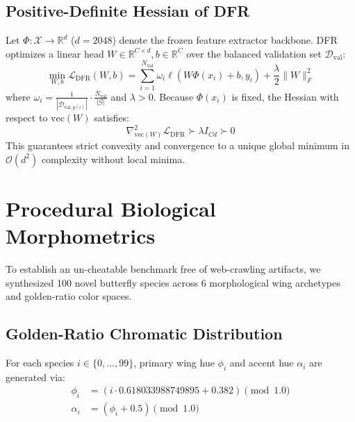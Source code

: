 \documentclass[10pt,journal,compsoc]{IEEEtran}
\begin{document}
\subsection{Positive-Definite Hessian of DFR}
Let $\Phi: \mathcal{X} \to \mathbb{R}^d$ ($d = 2048$) denote the frozen feature extractor backbone. DFR optimizes a linear head $W \in \mathbb{R}^{C \times d}, b \in \mathbb{R}^C$ over the balanced validation set $\mathcal{D}_{\text{val}}$:
\begin{equation}
\min_{W, b} \mathcal{L}_{\text{DFR}}(W, b) = \sum_{i=1}^{N_{\text{val}}} \omega_i \ell(W \Phi(x_i) + b, y_i) + \frac{\lambda}{2} \|W\|_F^2
\end{equation}
where $\omega_i = \frac{1}{|\mathcal{D}_{\text{val}, g(i)}|} \cdot \frac{N_{\text{val}}}{|\mathcal{G}|}$ and $\lambda > 0$. Because $\Phi(x_i)$ is fixed, the Hessian with respect to $\text{vec}(W)$ satisfies:
\begin{equation}
\nabla^2_{\text{vec}(W)} \mathcal{L}_{\text{DFR}} \succ \lambda I_{Cd} \succ 0
\end{equation}
This guarantees strict convexity and convergence to a unique global minimum in $\mathcal{O}(d^2)$ complexity without local minima.

\section{Procedural Biological Morphometrics}

To establish an un-cheatable benchmark free of web-crawling artifacts, we synthesized 100 novel butterfly species across 6 morphological wing archetypes and golden-ratio color spaces.

\subsection{Golden-Ratio Chromatic Distribution}
For each species $i \in \{0, \dots, 99\}$, primary wing hue $\phi_i$ and accent hue $\alpha_i$ are generated via:
\begin{align}
\phi_i &= (i \cdot 0.618033988749895 + 0.382) \pmod{1.0} \\
\alpha_i &= (\phi_i + 0.5) \pmod{1.0}
\end{align}
\end{document}
